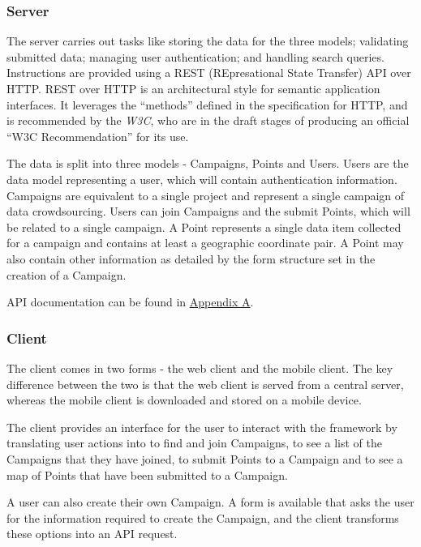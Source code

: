 \documentclass{article}
\begin{document}
		\subsubsection{Server}

		The server carries out tasks like storing the data for the three models; validating submitted data; managing user authentication; and handling search queries. Instructions are provided using a REST (REpresational State Transfer) API over HTTP. REST over HTTP is an architectural style for semantic application interfaces. It leverages the ``methods'' defined in the specification for HTTP, and is recommended by the \emph{W3C}, who are in the draft stages of producing an official ``W3C Recommendation'' for its use\cite{_w3c_2012}.

		The data is split into three models - Campaigns, Points and Users. Users are the data model representing a user, which will contain authentication information. Campaigns are equivalent to a single project and represent a single campaign of data crowdsourcing. Users can join Campaigns and the submit Points, which will be related to a single campaign. A Point represents a single data item collected for a campaign and contains at least a geographic coordinate pair. A Point may also contain other information as detailed by the form structure set in the creation of a Campaign.

		API documentation can be found in \hyperref[sec:api-docs]{Appendix A}.

		\subsubsection{Client}

		The client comes in two forms - the web client and the mobile client. The key difference between the two is that the web client is served from a central server, whereas the mobile client is downloaded and stored on a mobile device.

		The client provides an interface for the user to interact with the framework by translating user actions into to find and join Campaigns, to see a list of the Campaigns that they have joined, to submit Points to a Campaign and to see a map of Points that have been submitted to a Campaign.

		A user can also create their own Campaign. A form is available that asks the user for the information required to create the Campaign, and the client transforms these options into an API request.
\end{document}
